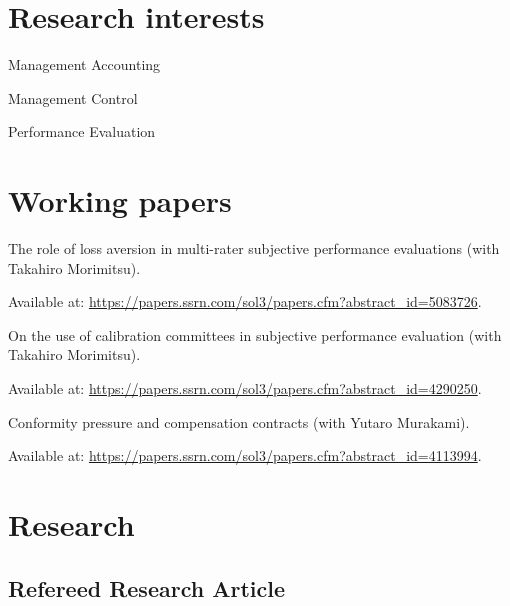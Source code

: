 \documentclass[letterpaper,uplatex]{article}
\renewenvironment{itemize}{
  \begin{list}{}{
    \setlength{\leftmargin}{1.5em}
  }
}{
  \end{list}
}
\begin{document}
\section*{Research interests}

\begin{itemize}
  \item Management Accounting
  \item Management Control
  \item Performance Evaluation
\end{itemize}

\section*{Working papers}

\begin{itemize}
    \item  The role of loss aversion in multi-rater subjective performance evaluations (with Takahiro Morimitsu).
        \begin{itemize}
            \item Available at: \url{https://papers.ssrn.com/sol3/papers.cfm?abstract_id=5083726}.
        \end{itemize}
    
    \item On the use of calibration committees in subjective performance evaluation (with Takahiro Morimitsu).
        \begin{itemize}
            \item Available at: \url{https://papers.ssrn.com/sol3/papers.cfm?abstract_id=4290250}.
        \end{itemize}
    
    \item Conformity pressure and compensation contracts (with Yutaro Murakami). 
        \begin{itemize}
            \item Available at: \url{https://papers.ssrn.com/sol3/papers.cfm?abstract_id=4113994}.
        \end{itemize}
\end{itemize}

\section*{Research}

\subsection*{Refereed Research Article}
\end{document}
